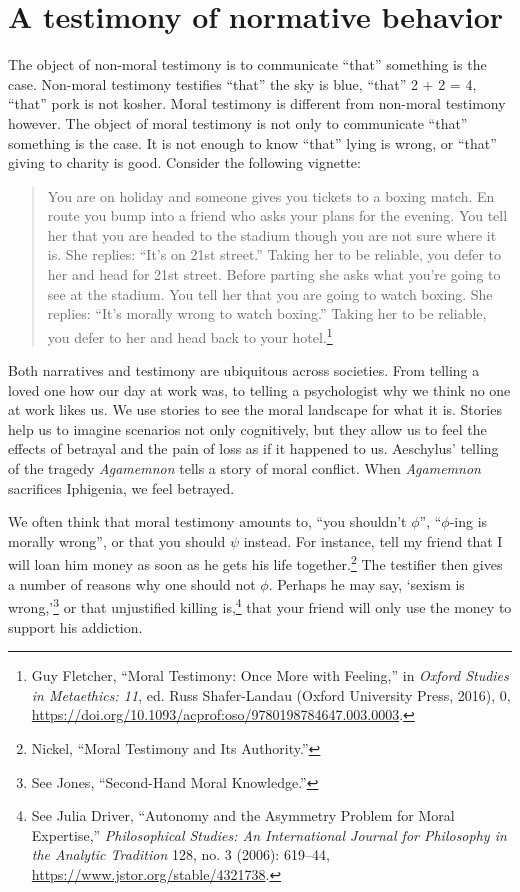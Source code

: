 \documentclass[phdthesis,12pt,final,a4paper]{wuthesis}
\theoremstyle{definition}
\theoremstyle{definition}
\theoremstyle{definition}
\theoremstyle{definition}
\theoremstyle{remark}
\begin{document}
\section{A testimony of normative behavior}\label{a-testimony-of-normative-behavior}

The object of non-moral testimony is to communicate ``that'' something is the case. Non-moral testimony testifies ``that'' the sky is blue, ``that'' 2 + 2 = 4, ``that'' pork is not kosher. Moral testimony is different from non-moral testimony however. The object of moral testimony is not only to communicate ``that'' something is the case. It is not enough to know ``that'' lying is wrong, or ``that'' giving to charity is good. Consider the following vignette:

\begin{quote}
You are on holiday and someone gives you tickets to a boxing match. En route you bump into a friend who asks your plans for the evening. You tell her that you are headed to the stadium though you are not sure where it is. She replies: ``It's on 21st street.'' Taking her to be reliable, you defer to her and head for 21st street. Before parting she asks what you're going to see at the stadium. You tell her that you are going to watch boxing. She replies: ``It's morally wrong to watch boxing.'' Taking her to be reliable, you defer to her and head back to your hotel.\footnote{Guy Fletcher, {``Moral {Testimony}: {Once More} with {Feeling},''} in \emph{Oxford {Studies} in {Metaethics}: 11}, ed. Russ Shafer-Landau (Oxford University Press, 2016), 0, \url{https://doi.org/10.1093/acprof:oso/9780198784647.003.0003}.}
\end{quote}

Both narratives and testimony are ubiquitous across societies. From telling a loved one how our day at work was, to telling a psychologist why we think no one at work likes us. We use stories to see the moral landscape for what it is. Stories help us to imagine scenarios not only cognitively, but they allow us to feel the effects of betrayal and the pain of loss as if it happened to us. Aeschylus' telling of the tragedy \emph{Agamemnon} tells a story of moral conflict. When \emph{Agamemnon} sacrifices Iphigenia, we feel betrayed.

We often think that moral testimony amounts to, ``you shouldn't \(\phi\)'', ``\(\phi\)-ing is morally wrong'', or that you should \(\psi\) instead. For instance, tell my friend that I will loan him money as soon as he gets his life together.\footnote{Nickel, {``Moral {Testimony} and Its {Authority}.''}} The testifier then gives a number of reasons why one should not \(\phi\). Perhaps he may say, `sexism is wrong,'\footnote{See Jones, {``Second-{Hand Moral Knowledge}.''}} or that unjustified killing is,\footnote{See Julia Driver, {``Autonomy and the {Asymmetry Problem} for {Moral Expertise},''} \emph{Philosophical Studies: An International Journal for Philosophy in the Analytic Tradition} 128, no. 3 (2006): 619--44, \url{https://www.jstor.org/stable/4321738}.} that your friend will only use the money to support his addiction.
\end{document}
